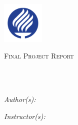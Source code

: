 \documentclass[
11pt, 
oneside,
english,
onehalfspacing,
onehalfspacing,
parskip,
headsepline,
chapterinoneline,
]{MastersDoctoralThesis}
\author{
\textbf{A01169284} - Bruno González Soria \\
\textbf{A01212611} - Antonio Osamu Katagiri Tanaka \\
\textbf{A01750267} - Carlos Cardoso Isidoro
}
\begin{document}
\frontmatter

\pagestyle{plain} 


\begin{titlepage}
\begin{center}

\vspace*{.06\textheight}
{\scshape\LARGE \univname\par} %

\includegraphics[width=0.15\textwidth]{./Figures/uniLogo.png}

\vspace{0.5cm}
\textsc{\Large Final Project Report}\\[0.5cm]      %

\HRule \\%
{\huge \bfseries \ttitle\par}\vspace{0.0cm} %
\HRule \\[0.5cm]                            %
 
\begin{minipage}[t]{0.4\textwidth}
\begin{flushleft} \large
\emph{Author(s):}\\

\authorname
\end{flushleft}
\end{minipage}
\begin{minipage}[t]{0.4\textwidth}
\begin{flushright} \large
\emph{Instructor(s):} \\
\supname


\end{flushright}
\end{minipage}
\end{center}
\end{titlepage}
\end{document}

